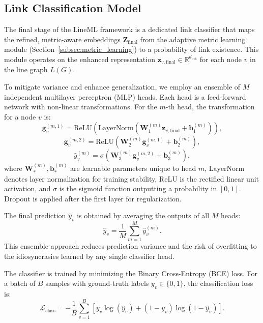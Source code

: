 \documentclass[pdflatex,sn-mathphys-num]{sn-jnl}%
\theoremstyle{thmstyleone}%
\theoremstyle{thmstyletwo}%
\theoremstyle{thmstylethree}%
\theoremstyle{plain} %
\theoremstyle{definition} %
\theoremstyle{remark} %
\theoremstyle{plain} %
\begin{document}
\subsection{Link Classification Model}
\label{sec:link_classifier}

The final stage of the LineML framework is a dedicated link classifier that maps the refined, metric-aware embeddings $\mathbf{Z}_{\text{final}}$ from the adaptive metric learning module (Section~\ref{subsec:metric_learning}) to a probability of link existence. This module operates on the enhanced representation $\mathbf{z}_{v,\text{final}} \in \mathbb{R}^{d_{\text{out}}}$ for each node $v$ in the line graph $L(G)$.

To mitigate variance and enhance generalization, we employ an ensemble of $M$ independent multilayer perceptron (MLP) heads. Each head is a feed-forward network with non-linear transformations. For the $m$-th head, the transformation for a node $v$ is:
\begin{equation}
    \mathbf{g}_v^{(m, 1)} = \text{ReLU}\left( \text{LayerNorm}\left( \mathbf{W}_1^{(m)} \mathbf{z}_{v,\text{final}} + \mathbf{b}_1^{(m)} \right) \right),
\end{equation}
\begin{equation}
    \mathbf{g}_v^{(m, 2)} = \text{ReLU}\left( \mathbf{W}_2^{(m)} \mathbf{g}_v^{(m, 1)} + \mathbf{b}_2^{(m)} \right),
\end{equation}
\begin{equation}
    \hat{y}_v^{(m)} = \sigma\left( \mathbf{W}_3^{(m)} \mathbf{g}_v^{(m, 2)} + \mathbf{b}_3^{(m)} \right),
\end{equation}
where $\mathbf{W}_*^{(m)}, \mathbf{b}_*^{(m)}$ are learnable parameters unique to head $m$, $\text{LayerNorm}$ denotes layer normalization for training stability, $\text{ReLU}$ is the rectified linear unit activation, and $\sigma$ is the sigmoid function outputting a probability in $[0,1]$. Dropout is applied after the first layer for regularization.

The final prediction $\hat{y}_v$ is obtained by averaging the outputs of all $M$ heads:
\begin{equation}
    \hat{y}_v = \frac{1}{M} \sum_{m=1}^{M} \hat{y}_v^{(m)}.
\end{equation}
This ensemble approach reduces prediction variance and the risk of overfitting to the idiosyncrasies learned by any single classifier head.

The classifier is trained by minimizing the Binary Cross-Entropy (BCE) loss. For a batch of $B$ samples with ground-truth labels $y_v \in \{0,1\}$, the classification loss is:
\begin{equation}
    \mathcal{L}_{\text{class}} = - \frac{1}{B} \sum_{v=1}^{B} \left[ y_v \log(\hat{y}_v) + (1 - y_v) \log(1 - \hat{y}_v) \right].
\end{equation}
\end{document}
